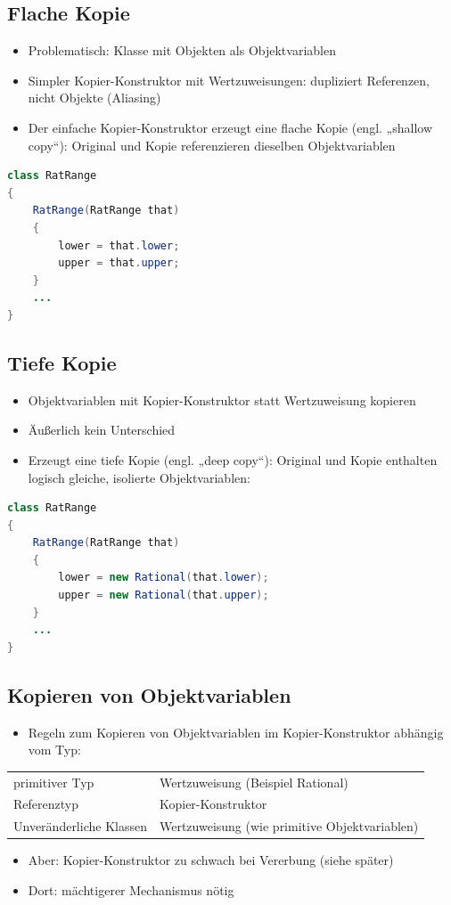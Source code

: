 \subsection{Flache Kopie}
\begin{itemize}
\item Problematisch: Klasse mit Objekten als Objektvariablen
\item  Simpler Kopier-Konstruktor mit Wertzuweisungen: dupliziert Referenzen, nicht Objekte (Aliasing)
\item  Der einfache Kopier-Konstruktor erzeugt eine flache Kopie (engl. „shallow copy“): Original und Kopie referenzieren dieselben Objektvariablen
\end{itemize}
\begin{lstlisting}[language=JAVA]
class RatRange
{
	RatRange(RatRange that)
	{
		lower = that.lower;
		upper = that.upper;
	}
	...
}
\end{lstlisting}

\subsection{Tiefe Kopie}
\begin{itemize}
\item Objektvariablen mit Kopier-Konstruktor statt Wertzuweisung kopieren
\item Äußerlich kein Unterschied
\item Erzeugt eine tiefe Kopie (engl. „deep copy“): Original und Kopie enthalten logisch gleiche, isolierte Objektvariablen:
\end{itemize}
\begin{lstlisting}[language=JAVA]
class RatRange
{
	RatRange(RatRange that)
	{
		lower = new Rational(that.lower);
		upper = new Rational(that.upper);
	}
	...
}
\end{lstlisting}

\subsection{Kopieren von Objektvariablen}
\begin{itemize}
\item Regeln zum Kopieren von Objektvariablen im Kopier-Konstruktor abhängig vom Typ:
\end{itemize}
\begin{tabular}{ll}
primitiver Typ & Wertzuweisung (Beispiel Rational)\\
Referenztyp & Kopier-Konstruktor\\
Unveränderliche Klassen & Wertzuweisung (wie primitive Objektvariablen)\\
\end{tabular}		
\begin{itemize}
\item Aber: Kopier-Konstruktor zu schwach bei Vererbung (siehe später)
\item Dort: mächtigerer Mechanismus nötig
\end{itemize}

